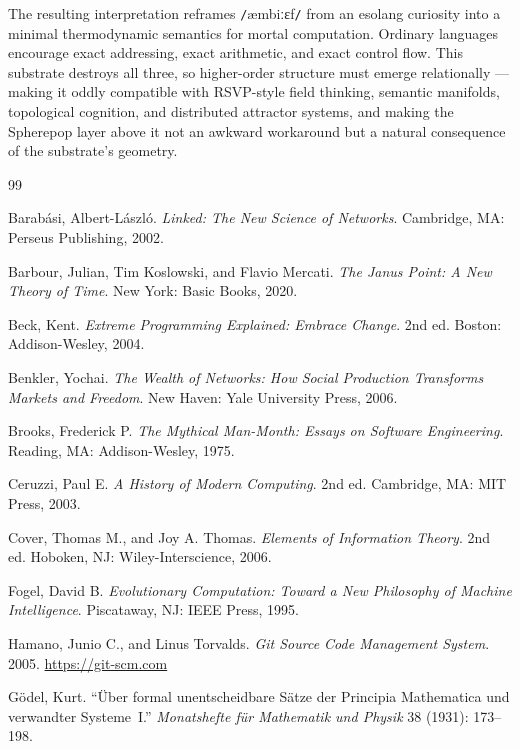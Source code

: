 \documentclass[12pt]{article}
\newcommand{\ambibf}{%
  \texttt{/}\textnormal{æmbiːɛf}\texttt{/}%
}
\begin{document}
The resulting interpretation reframes \ambibf{}
from an esolang curiosity into a minimal thermodynamic semantics for mortal
computation. Ordinary languages encourage exact addressing, exact arithmetic,
and exact control flow. This substrate destroys all three, so higher-order
structure must emerge relationally --- making it oddly compatible with RSVP-style
field thinking, semantic manifolds, topological cognition, and distributed
attractor systems, and making the Spherepop layer above it not an awkward
workaround but a natural consequence of the substrate's geometry.

\begin{thebibliography}{99}

Barab\'asi, Albert-L\'aszl\'o.
\textit{Linked: The New Science of Networks}.
Cambridge, MA\@: Perseus Publishing, 2002.

Barbour, Julian, Tim Koslowski, and Flavio Mercati.
\textit{The Janus Point: A New Theory of Time}.
New York: Basic Books, 2020.

Beck, Kent.
\textit{Extreme Programming Explained: Embrace Change}.
2nd ed.
Boston: Addison-Wesley, 2004.

Benkler, Yochai.
\textit{The Wealth of Networks: How Social Production Transforms Markets and Freedom}.
New Haven: Yale University Press, 2006.

Brooks, Frederick P.
\textit{The Mythical Man-Month: Essays on Software Engineering}.
Reading, MA\@: Addison-Wesley, 1975.

Ceruzzi, Paul E.
\textit{A History of Modern Computing}.
2nd ed.
Cambridge, MA\@: MIT Press, 2003.

Cover, Thomas M., and Joy A. Thomas.
\textit{Elements of Information Theory}.
2nd ed.
Hoboken, NJ\@: Wiley-Interscience, 2006.

Fogel, David B.
\textit{Evolutionary Computation: Toward a New Philosophy of Machine Intelligence}.
Piscataway, NJ\@: IEEE Press, 1995.

Hamano, Junio C., and Linus Torvalds.
\textit{Git Source Code Management System}.
2005.
\url{https://git-scm.com}

G\"odel, Kurt.
``\"Uber formal unentscheidbare S\"atze der Principia Mathematica und verwandter
Systeme~I\@.''
\textit{Monatshefte f\"ur Mathematik und Physik} 38 (1931): 173--198.


\end{thebibliography}
\end{document}
